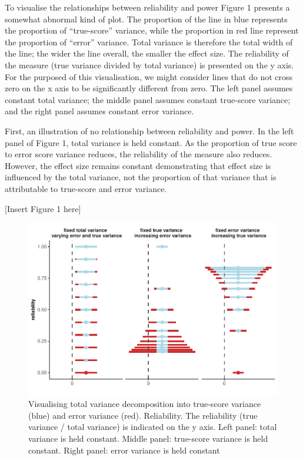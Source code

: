 \documentclass[english,,man]{apa6}
\begin{document}
To visualise the relationships between reliability and power Figure 1 presents a somewhat abnormal kind of plot. The proportion of the line in blue represents the proportion of \enquote{true-score} variance, while the proportion in red line represent the proportion of \enquote{error} variance. Total variance is therefore the total width of the line; the wider the line overall, the smaller the effect size. The reliability of the measure (true variance divided by total variance) is presented on the y axis. For the purposed of this visualisation, we might consider lines that do not cross zero on the x axis to be significantly different from zero. The left panel assumes constant total variance; the middle panel assumes constant true-score variance; and the right panel assumes constant error variance.

First, an illustration of no relationship between reliability and power. In the left panel of Figure 1, total variance is held constant. As the proportion of true score to error score variance reduces, the reliability of the measure also reduces. However, the effect size remains constant demonstrating that effect size is influenced by the total variance, not the proportion of that variance that is attributable to true-score and error variance.

\begin{center}
  
  [Insert Figure 1 here]
  
  \end{center}

\begin{figure}[H]
\includegraphics{visualising_reliability_and_power_relationships_v2_files/figure-latex/plotting1-1} \caption{Visualising total variance decomposition into true-score variance (blue) and error variance (red). Reliability. The reliability (true variance / total variance) is indicated on the y axis. Left panel: total variance is held constant. Middle panel: true-score variance is held constant. Right panel: error variance is held constant}\label{fig:plotting1}
\end{figure}
\end{document}
